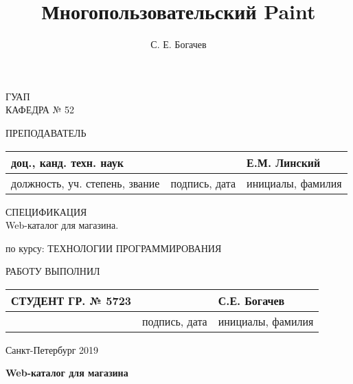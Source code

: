 \documentclass[a4paper,14pt]{extarticle} %
\author{С. Е. Богачев}
\title{Многопользовательский Paint}
\begin{document}
\begin{titlepage}
\begin{center}

ГУАП\\
КАФЕДРА № 52\\
\vspace{2cm}

\begin{flushleft}
ПРЕПОДАВАТЕЛЬ
\begin{tabular}{|l|l|l|}
\hline
доц., канд. техн. наук & & Е.М. Линский\\
\hline
должность, уч. степень, звание & подпись, дата & инициалы, фамилия\\
\hline
\end{tabular}
\end{flushleft}

\vspace{3cm}

{\Large СПЕЦИФИКАЦИЯ\\}
\vspace{0.3cm}
{\Large Web-каталог для магазина.}

\vspace{0.7cm}

\begin{flushleft}
по курсу: ТЕХНОЛОГИИ ПРОГРАММИРОВАНИЯ
\end{flushleft}

\vspace{5cm}

\begin{flushleft}
РАБОТУ ВЫПОЛНИЛ
\begin{tabular}{|l|l|l|}
\hline
СТУДЕНТ ГР. № 5723 & & С.Е. Богачев\\
\hline
& подпись, дата & инициалы, фамилия\\
\hline
\end{tabular}
\end{flushleft}

\vspace{2cm}

Санкт-Петербург 2019

\end{center}
\end{titlepage}
\renewcommand{\chaptername}{Раздел}
\renewcommand{\figurename}{Рисунок}

\begin{center}
\huge \bf Web-каталог для магазина
\end{center}

\setcounter{page}{2}
\end{document}
